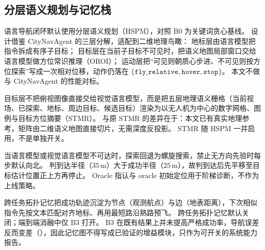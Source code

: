 



\subsection{分层语义规划与记忆栈}
\label{sec:hspm}
语言导航闭环默认使用分层语义规划（HSPM），对照 B0 为关键词贪心基线。
设计借鉴 CityNavAgent 的三层分解\cite{zhang2025citynavagent}，适配到二维地理鸟瞰：
地标层由语言模型把指令拆成有序子目标；
目标层在当前子目标不可见时，把语义地图局部窗口交给语言模型做方位常识推理（OROI）；
运动层把``可见则朝质心步进、不可见则按方位探索''写成一次相对位移，动作仍落在 $\{\texttt{fly\_relative},\texttt{hover},\texttt{stop}\}$。
本文不做与 CityNavAgent 的性能对标。

目标层不把俯视图像直接交给视觉语言模型，而是把五层地理语义栅格（当前视场、已探索、地标、周边目标、候选目标）渲染为以无人机为中心的数字网格、图例与目标方位摘要（STMR）\cite{gao2024stmr}。
与原 STMR 的差异在于：本文已有真实地理参考，矩阵由二维语义地图直接切片，无需深度反投影。
STMR 随 HSPM 一并启用，不是单独开关。

当语言模型或视觉语言模型不可达时，探索回退为螺旋搜索，禁止无方向先验时每步默认向北。
判到达半径（$35\,\mathrm{m}$）大于成功半径（$25\,\mathrm{m}$），故判到达后先平移至目标估计位置正上方再停止。
Oracle 指认与 oracle 初始定位用于阶梯诊断，不作为上线策略。

跨任务拓扑记忆把成功轨迹沉淀为节点（观测航点）与边（地表距离），下次相似指令先按文本匹配对齐地标、再用最短路沿熟路预飞\cite{shah2023lmnav}。
跨任务拓扑记忆默认关闭；端到端消融中仅 B3 打开。
B3 在既有结果上并未提高严格成功率，导航误差反而变差（），因此记忆图不得写成已验证的增益模块，只作为可开关的系统能力报告。
